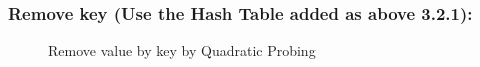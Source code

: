 \subsubsection{Remove key (Use the Hash Table added as above 3.2.1):}
\begin{figure}[H]
	\centering
	\qquad
	\caption{Remove value by key by Quadratic Probing}%
\end{figure}

